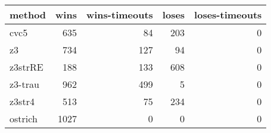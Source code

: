 \begin{tabular}{lrrrr}
\hline
 method   &   wins &   wins-timeouts &   loses &   loses-timeouts \\
\hline
 cvc5     &    635 &              84 &     203 &                0 \\
 z3       &    734 &             127 &      94 &                0 \\
 z3strRE  &    188 &             133 &     608 &                0 \\
 z3-trau  &    962 &             499 &       5 &                0 \\
 z3str4   &    513 &              75 &     234 &                0 \\
 ostrich  &   1027 &               0 &       0 &                0 \\
\hline
\end{tabular}
